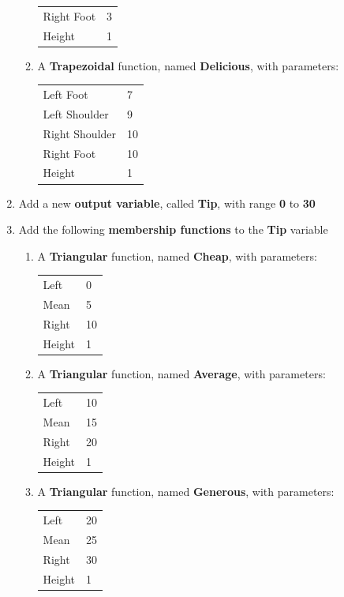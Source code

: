 \begin{enumerate}
\begin{enumerate}
\begin{tabular}{ll}
	Right Foot 		& 3		\\
	Height			& 1   	\\
	\end{tabular}
	\item A \textbf{Trapezoidal} function, named \textbf{Delicious}, with parameters:\\
	\begin{tabular}{ll}
	Left Foot 		& 7		\\
	Left Shoulder 	& 9		\\
	Right Shoulder 	& 10	\\
	Right Foot 		& 10	\\
	Height			& 1   	\\
	\end{tabular}		
	\end{enumerate}
\newpage 
\item Add a new \textbf{output variable}, called \textbf{Tip}, with range \textbf{0} to \textbf{30}	
\item Add the following \textbf{membership functions} to the \textbf{Tip} variable
	\begin{enumerate}
	\item A \textbf{Triangular} function, named \textbf{Cheap}, with parameters:\\
	\begin{tabular}{ll}
	Left  			& 0		\\
	Mean 			& 5		\\
	Right 			& 10		\\
	Height			& 1   	\\
	\end{tabular}
	\item A \textbf{Triangular} function, named \textbf{Average}, with parameters:\\
	\begin{tabular}{ll}
	Left  			& 10		\\
	Mean 			& 15		\\
	Right 			& 20		\\
	Height			& 1   	\\
	\end{tabular}	
	\item A \textbf{Triangular} function, named \textbf{Generous}, with parameters:\\
	\begin{tabular}{ll}
	Left  			& 20		\\
	Mean 			& 25		\\
	Right 			& 30		\\
	Height			& 1   	\\

\end{tabular}
\end{enumerate}
\end{enumerate}
